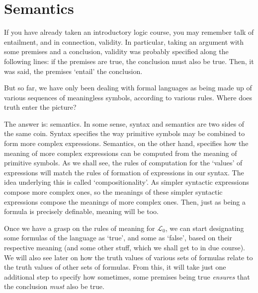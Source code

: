 \chapter{Semantics}

If you have already taken an introductory logic course, you may remember talk of entailment, and in connection, validity. In particular, taking an argument with some premises and a conclusion, validity was probably specified along the following lines: if the premises are true, the conclusion must also be true. Then, it was said, the premises `entail' the conclusion. 

But so far, we have only been dealing with formal languages as being made up of various sequences of meaningless symbols, according to various rules. Where does truth enter the picture? 

The answer is: semantics. In some sense, syntax and semantics are two sides of the same coin. Syntax specifies the way primitive symbols may be combined to form more complex expressions. Semantics, on the other hand, specifies how the meaning of more complex expressions can be computed from the meaning of primitive symbols. As we shall see, the rules of computation for the `values' of expressions will match the rules of formation of expressions in our syntax. The idea underlying this is called `compositionality'. As simpler syntactic expressions compose more complex ones, so the meanings of these simpler syntactic expressions compose the meanings of more complex ones. Then, just as being a formula is precisely definable, meaning will be too. 

Once we have a grasp on the rules of meaning for $\mathcal{L}_0$, we can start designating some formulas of the language as `true', and some as `false', based on their respective meaning (and some other stuff, which we shall get to in due course). We will also see later on how the truth values of various sets of formulas relate to the truth values of other sets of formulas. From this, it will take just one additional step to specify how sometimes, some premises being true \textit{ensures} that the conclusion \textit{must} also be true. 


